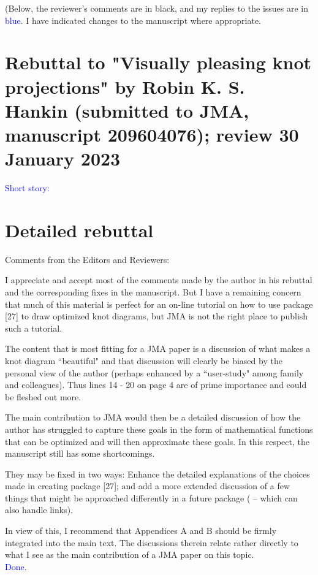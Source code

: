 \documentclass[12pt]{article}
\begin{document}
(Below, the reviewer's comments are in black, and my replies to the
issues are in \textcolor{blue}{blue}.  I have indicated changes to the
manuscript where appropriate.

\section*{Rebuttal to "Visually pleasing knot projections" by
  Robin K. S. Hankin (submitted to JMA, manuscript 209604076); review
  30 January 2023}

\textcolor{blue}{ Short story: }



\section*{Detailed rebuttal}



Comments from the Editors and Reviewers:

I appreciate and accept most of the comments made by the author in his
rebuttal and the corresponding fixes in the manuscript.  But I have a
remaining concern that much of this material is perfect for an on-line
tutorial on how to use package [27] to draw optimized knot diagrams,
but JMA is not the right place to publish such a tutorial.

The content that is most fitting for a JMA paper is a discussion of
what makes a knot diagram ``beautiful" and that discussion will
clearly be biased by the personal view of the author (perhaps enhanced
by a ``user-study" among family and colleagues).  Thus lines 14 - 20
on page 4 are of prime importance and could be fleshed out more.

The main contribution to JMA would then be a detailed discussion of
how the author has struggled to capture these goals in the form of
mathematical functions that can be optimized and will then approximate
these goals.  In this respect, the manuscript still has some
shortcomings.

They may be fixed in two ways: Enhance the detailed explanations of
the choices made in creating package [27]; and add a more extended
discussion of a few things that might be approached differently in a
future package ( -- which can also handle links).

In view of this, I recommend that Appendices A and B should be firmly
integrated into the main text.  The discussions therein relate rather
directly to what I see as the main contribution of a JMA paper on this
topic.\textcolor{blue}{\\Done.\\ \\}
\end{document}
